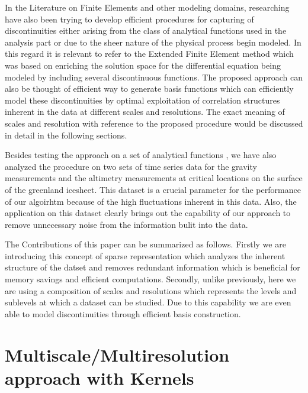 \documentclass[procedia]{easychair}
\begin{document}
In the Literature on Finite Elements and other modeling domains, researching have also been trying to develop efficient procedures for capturing of discontinuities either arising from the class of analytical functions used in the analysis part or due to the sheer nature of the physical process begin modeled. In this regard it is relevant to refer to the Extended Finite Element method \cite{NME:NME726} which was based on enriching the solution space for the differential equation being modeled by including several discontinuous functions. The proposed approach can also be thought of efficient way to generate basis functions which can efficiently model these discontinuities by optimal exploitation of correlation structures inherent in the data at different scales and resolutions. The exact meaning of scales and resolution with reference to the proposed procedure would be discussed in detail in the following sections. 

Besides testing the approach on a set of analytical functions \cite{simulationlib}, we have also analyzed the procedure on two sets of time series data for the gravity measurements \cite{luthcke2013antarctica} and the altimetry measurements \cite{schenk2012new} at critical locations on the surface of the greenland icesheet. This dataset is a crucial parameter for the performance of our algoirhtm because of the high fluctuations inherent in this data. Also, the application on this dataset clearly brings out the capability of our approach to remove unnecessary noise from the information bulit into the data. 

The Contributions of this paper can be summarized as follows. Firstly we are introducing this concept of sparse representation which analyzes the inherent structure of the datset and removes redundant information which is beneficial for memory savings and efficient computations. Secondly, unlike previously, here we are using a composition of scales and resolutions which represents the levels and sublevels at which a  dataset can be studied. Due to this capability we are even able to model discontinuities through efficient basis construction.




\section{Multiscale/Multiresolution approach with Kernels }
\label{sect:approach}
\end{document}
